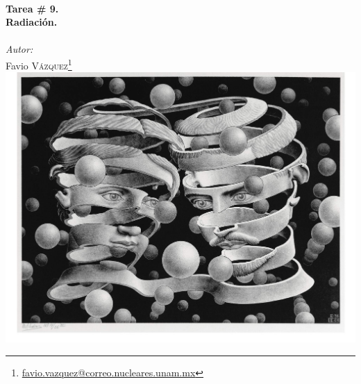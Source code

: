 \documentclass[a4paper,11pt]{article}
\numberwithin{equation}{section}
\begin{document}
\begin{titlepage}

\HRule \\[0.1cm]
{ \huge \bfseries Tarea \# 9. \\ Radiación.}\\ %
\HRule \\[0.1cm]
 
\setcounter{footnote}{0}
\center
\large
\emph{Autor:} \\ %
\Large Favio \textsc{Vázquez}\footnote[1]{\href{mailto:favio.vazquez@correo.nucleares.unam.mx}{favio.vazquez@correo.nucleares.unam.mx}}
\\[0.7cm]

\includegraphics[scale=0.56]{escherCaras}


\vfill %

\end{titlepage}
\end{document}
